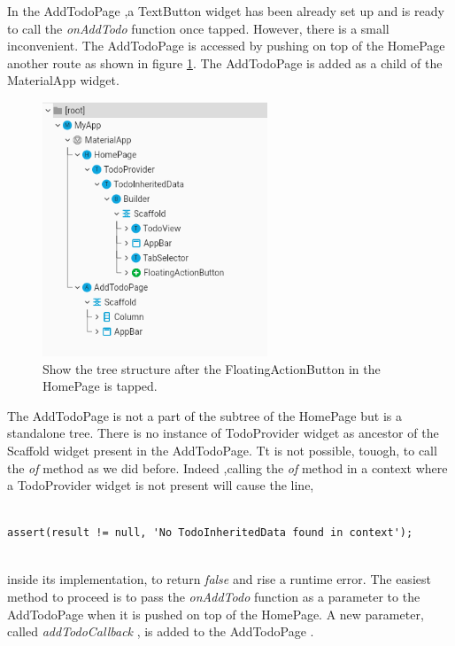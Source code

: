 In the AddTodoPage ,a TextButton widget has been already set up and is ready to call the \textit{onAddTodo }function once tapped. However, there is a small inconvenient. The AddTodoPage is accessed by pushing on top of the HomePage another route as shown in figure \ref{fig:add_todo_page_tree_structure}. The AddTodoPage is added as a child of the MaterialApp widget.

\begin{figure}[H]
    \centering
    \includegraphics[width=0.6\textwidth]{Images/tree_structure_on_AddTodoPage.png}
    \caption{Show the tree structure after the FloatingActionButton in the HomePage is tapped.}
    \label{fig:add_todo_page_tree_structure}
\end{figure}


The AddTodoPage is not a part of the subtree of the HomePage but is a standalone tree. There is no instance of TodoProvider widget as ancestor of the  Scaffold widget present in the AddTodoPage. Tt is not possible, touogh, to call the \textit{of} method as  we did before. Indeed ,calling the \textit{of} method in a context where a TodoProvider widget is not present will cause the line,
\mbox{}\\

\begin{code}
\label{code:2.33}
\begin{verbatim}

assert(result != null, 'No TodoInheritedData found in context');
\end{verbatim}
\end{code}
\mbox{}\\
inside its implementation, to return \textit{false} and rise a runtime error. The easiest method to proceed is to pass the \textit{onAddTodo} function as a parameter to the AddTodoPage when it is pushed on top of the HomePage. A new parameter, called \textit{addTodoCallback }, is added to the AddTodoPage .
\mbox{}\\


